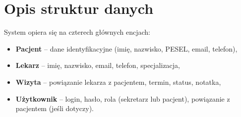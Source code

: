 \section{Opis struktur danych}
System opiera się na czterech głównych encjach:
\begin{itemize}
  \item \textbf{Pacjent} -- dane identyfikacyjne (imię, nazwisko, PESEL, email, telefon),
  \item \textbf{Lekarz} -- imię, nazwisko, email, telefon, specjalizacja,
  \item \textbf{Wizyta} -- powiązanie lekarza z pacjentem, termin, status, notatka,
  \item \textbf{Użytkownik} -- login, hasło, rola (sekretarz lub pacjent), powiązanie z pacjentem (jeśli dotyczy).
\end{itemize}

